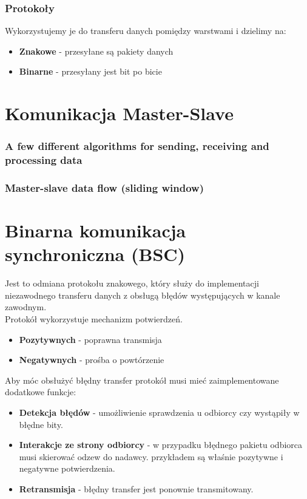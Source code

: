 \documentclass[a4paper,twoside]{article}
\begin{document}
\section{Protokoły}
Wykorzystujemy je do transferu danych pomiędzy warstwami i dzielimy na:
\begin{itemize}
	\item \textbf{Znakowe} - przesyłane są pakiety danych
	\item \textbf{Binarne} - przesyłany jest bit po bicie
\end{itemize}



\part{Komunikacja Master-Slave}
\section{A few different algorithms for sending, receiving and processing data}
\section{Master-slave data flow (sliding window)}




\part{Binarna komunikacja synchroniczna (BSC)}
Jest to odmiana protokołu znakowego, który służy do implementacji niezawodnego transferu danych z obsługą błędów występujących w kanale zawodnym.\\
Protokół wykorzystuje mechanizm potwierdzeń.
\begin{itemize}
	\item \textbf{Pozytywnych} - poprawna transmisja
	\item \textbf{Negatywnych} - prośba o powtórzenie
\end{itemize}
Aby móc obsłużyć błędny transfer protokół musi mieć zaimplementowane dodatkowe funkcje:
\begin{itemize}
	\item \textbf{Detekcja błędów} - umożliwienie sprawdzenia u odbiorcy czy wystąpiły w błędne bity.
	\item \textbf{Interakcje ze strony odbiorcy} - w przypadku błędnego pakietu odbiorca musi skierować odzew do nadawcy. przykładem są właśnie pozytywne i negatywne potwierdzenia.
	\item \textbf{Retransmisja} - błędny transfer jest ponownie transmitowany.
\end{itemize}
\end{document}
